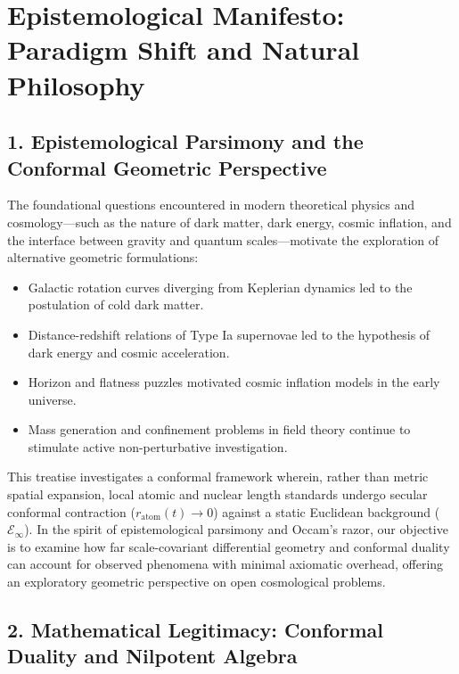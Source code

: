 \section*{Epistemological Manifesto: Paradigm Shift and Natural Philosophy}
\label{sec:epistemolojik_manifest}

\subsection*{1. Epistemological Parsimony and the Conformal Geometric Perspective}

The foundational questions encountered in modern theoretical physics and cosmology—such as the nature of dark matter, dark energy, cosmic inflation, and the interface between gravity and quantum scales—motivate the exploration of alternative geometric formulations:
\begin{itemize}
    \item Galactic rotation curves diverging from Keplerian dynamics led to the postulation of cold dark matter.
    \item Distance-redshift relations of Type Ia supernovae led to the hypothesis of dark energy and cosmic acceleration.
    \item Horizon and flatness puzzles motivated cosmic inflation models in the early universe.
    \item Mass generation and confinement problems in field theory continue to stimulate active non-perturbative investigation.
\end{itemize}

This treatise investigates a conformal framework wherein, rather than metric spatial expansion, local atomic and nuclear length standards undergo secular conformal contraction ($r_{\mathrm{atom}}(t) \to 0$) against a static Euclidean background ($\mathcal{E}_\infty$). In the spirit of epistemological parsimony and Occam's razor, our objective is to examine how far scale-covariant differential geometry and conformal duality can account for observed phenomena with minimal axiomatic overhead, offering an exploratory geometric perspective on open cosmological problems.

\subsection*{2. Mathematical Legitimacy: Conformal Duality and Nilpotent Algebra}

